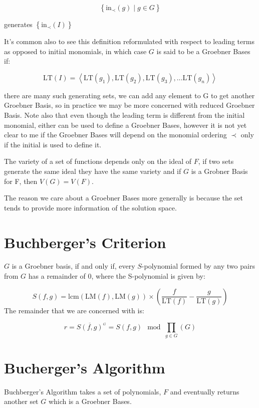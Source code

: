 \documentclass[a4paper,11pt,twoside]{article}
\begin{document}
\[
    \left\{ \mathrm{in}_{\prec}\left(g\right)\mid g\in G\right\} 
    \]

generates \(\left\{ \mathrm{in}_{\prec}\left(I\right)\right\}\)

It's common also to see this definition reformulated with respect
to leading terms as opposed to initial monomials, in which case
\(G\) is said to be a Groebner Bases if: \cite[2.5]{coxIdealsVarietiesAlgorithms1997}

\[
    \mathrm{LT}\left(I\right)=\left\langle \mathrm{LT}\left(g_{1}\right),\mathrm{LT}\left(g_{2}\right),\mathrm{LT}\left(g_{3}\right),\ldots\mathrm{LT}\left(g_{n}\right)\right\rangle 
    \]

there are many such generating sets, we can add any element to G
to get another Groebner Basis, so in practice we may be more
concerned with reduced Groebner Basis. Note also that even though
the leading term is different from the initial monomial, either
can be used to define a Groebner Bases, however it is not yet
clear to me if the Groebner Bases will depend on the monomial
ordering \(\prec\) only if the initial is used to define it.

The variety of a set of functions depends only on the ideal of
\(F\), if two sets generate the same ideal they have the same
variety and if \(G\) is
a Grobner Basis for F, then \(V(G)=V(F)\). 

The reason we care about a Groebner Bases more generally is
because the set tends to provide more information of the solution space.

\section{Buchberger's Criterion}
\label{sec:org7ec28ec}
\(G\) is a Groebner basis, if and only if, every \(S\)-polynomial
formed by any two pairs from \(G\) has a remainder of 0, where
the S-polynomial is given by: \cite[\S 2.6]{coxIdealsVarietiesAlgorithms1997}

\[
    S\left(f,g\right)=\mathrm{lcm}\left(\mathrm{LM}\left(f\right),\mathrm{LM}\left(g\right)\right)\times\left(\frac{f}{\mathrm{LT}\left(f\right)}-\frac{g}{\mathrm{LT}\left(g\right)}\right)
    \]
The remainder that we are concerned with is:

\[
    r = {\overline{S(f,g)}^{_G}} = S(f,g) \mod \prod_{g\in G} \left(G \right)
    \]
\section{Bucherger's Algorithm}
\label{sec:orge82bbcc}
Buchberger's Algorithm takes a set of polynomials, \(F\) and
eventually returns another set \(G\) which is a Groebner Bases.
\end{document}
